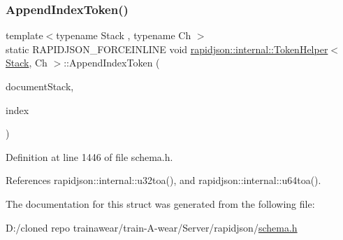 \subsubsection{\texorpdfstring{AppendIndexToken()}{AppendIndexToken()}}
{\footnotesize\ttfamily template$<$typename Stack , typename Ch $>$ \\
static R\+A\+P\+I\+D\+J\+S\+O\+N\+\_\+\+F\+O\+R\+C\+E\+I\+N\+L\+I\+NE void \mbox{\hyperlink{structrapidjson_1_1internal_1_1_token_helper}{rapidjson\+::internal\+::\+Token\+Helper}}$<$ \mbox{\hyperlink{classrapidjson_1_1internal_1_1_stack}{Stack}}, Ch $>$\+::Append\+Index\+Token (\begin{DoxyParamCaption}\item[{\mbox{\hyperlink{classrapidjson_1_1internal_1_1_stack}{Stack}} \&}]{document\+Stack,  }\item[{\mbox{\hyperlink{namespacerapidjson_a44eb33eaa523e36d466b1ced64b85c84}{Size\+Type}}}]{index }\end{DoxyParamCaption})\hspace{0.3cm}{\ttfamily [static]}}



Definition at line 1446 of file schema.\+h.


\begin{DoxyCode}{0}

\end{DoxyCode}


References rapidjson\+::internal\+::u32toa(), and rapidjson\+::internal\+::u64toa().



The documentation for this struct was generated from the following file\+:\begin{DoxyCompactItemize}
\item 
D\+:/cloned repo trainawear/train-\/\+A-\/wear/\+Server/rapidjson/\mbox{\hyperlink{schema_8h}{schema.\+h}}\end{DoxyCompactItemize}
